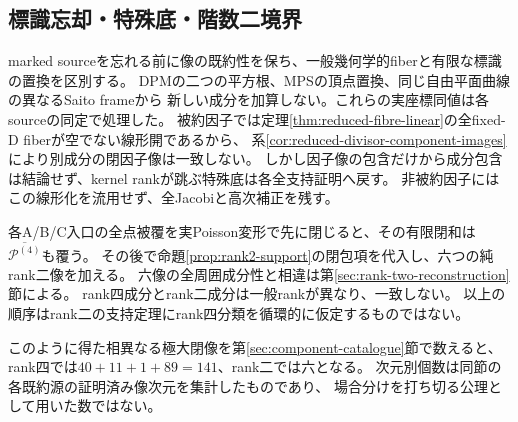 \subsection{標識忘却・特殊底・階数二境界}
marked sourceを忘れる前に像の既約性を保ち、一般幾何学的fiberと有限な標識の置換を区別する。
DPMの二つの平方根、MPSの頂点置換、同じ自由平面曲線の異なるSaito frameから
新しい成分を加算しない。これらの実座標同値は各sourceの同定で処理した。
被約因子では定理\ref{thm:reduced-fibre-linear}の全fixed-D fiberが空でない線形開であるから、
系\ref{cor:reduced-divisor-component-images}により別成分の閉因子像は一致しない。
しかし因子像の包含だけから成分包含は結論せず、kernel rankが跳ぶ特殊底は各全支持証明へ戻す。
非被約因子にはこの線形化を流用せず、全Jacobiと高次補正を残す。

各A/B/C入口の全点被覆を実Poisson変形で先に閉じると、その有限閉和は
$\overline{\mathcal P^{(4)}}$も覆う。
その後で命題\ref{prop:rank2-support}の閉包項を代入し、六つの純rank二像を加える。
六像の全周囲成分性と相違は第\ref{sec:rank-two-reconstruction}節による。
rank四成分とrank二成分は一般rankが異なり、一致しない。
以上の順序はrank二の支持定理にrank四分類を循環的に仮定するものではない。

このように得た相異なる極大閉像を第\ref{sec:component-catalogue}節で数えると、
rank四では$40+11+1+89=141$、rank二では六となる。
次元別個数は同節の各既約源の証明済み像次元を集計したものであり、
場合分けを打ち切る公理として用いた数ではない。

